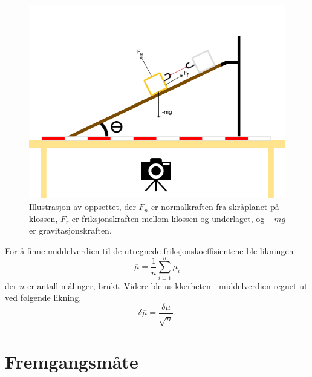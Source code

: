 \documentclass[10pt,a4paper]{report}
\begin{document}
\begin{figure}[h]
\begin{center}
\includegraphics[scale=0.3]{withforces}
\caption{Illustrasjon av oppsettet, der $F_n$ er normalkraften fra skråplanet på klossen, $F_r$ er friksjonskraften mellom klossen og underlaget, og $-mg$ er gravitasjonskraften.}
\end{center}
\label{oppsett}
\end{figure}

For å finne middelverdien til de utregnede friksjonskoeffisientene ble likningen
\begin{equation}
\overline{\mu} = \dfrac{1}{n}\sum_{i=1}^{n}\mu_i
\end{equation}
 der $n$ er antall målinger, brukt. Videre ble usikkerheten i middelverdien regnet ut ved følgende likning,
\begin{equation}
\delta\overline{\mu} = \dfrac{\delta\mu}{\sqrt{n}}.
\end{equation}

\chapter*{Fremgangsmåte}
\end{document}
